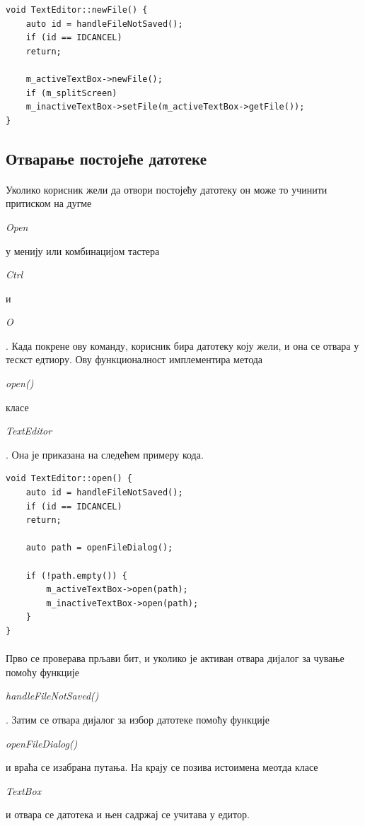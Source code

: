 \documentclass[12pt,oneside]{memoir}
\begin{document}
\begin{verbatim}
void TextEditor::newFile() {
	auto id = handleFileNotSaved();
	if (id == IDCANCEL)
	return;
	
	m_activeTextBox->newFile();
	if (m_splitScreen)
	m_inactiveTextBox->setFile(m_activeTextBox->getFile());
}
\end{verbatim}

\subsection{Отварање постојеће датотеке}
\paragraph{}
Уколико корисник жели да отвори постојећу датотеку он може то учинити притиском
на дугме \begin{latinica}\textit{Open}\end{latinica} у менију или комбинацијом
тастера \begin{latinica}\textit{Ctrl}\end{latinica} и \begin{latinica}\textit{O}\end{latinica}. Када покрене ову команду, корисник
бира датотеку коју жели, и она се отвара у тескст едтиору. Ову функционалност
имплементира метода \begin{latinica}\textit{open()}\end{latinica} класе
\begin{latinica}\textit{TextEditor}\end{latinica}. Она је приказана
на следећем примеру кода.

\begin{verbatim}
void TextEditor::open() {
	auto id = handleFileNotSaved();
	if (id == IDCANCEL)
	return;
	
	auto path = openFileDialog();
	
	if (!path.empty()) {
		m_activeTextBox->open(path);
		m_inactiveTextBox->open(path);
	}
}
\end{verbatim}

\paragraph{}
Прво се проверава прљави бит, и уколико је активан отвара дијалог за чување помоћу
функције \begin{latinica}\textit{handleFileNotSaved()}\end{latinica}. Затим се 
отвара дијалог за избор датотеке помоћу функције
\begin{latinica}\textit{openFileDialog()}\end{latinica}  и враћа се изабрана
путања. На крају се позива истоимена меотда класе
\begin{latinica}\textit{TextBox}\end{latinica} и отвара се датотека и њен садржај
се учитава у едитор.
\end{document}
